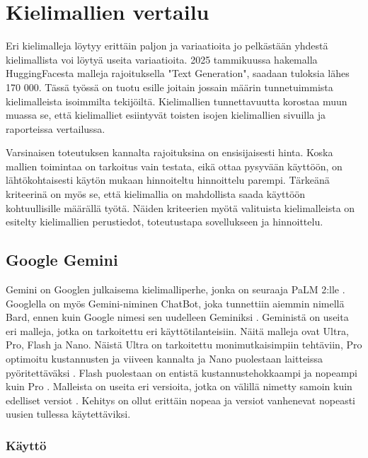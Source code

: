\chapter{Kielimallien vertailu}
\label{ch:vertailu}

Eri kielimalleja löytyy erittäin paljon ja variaatioita jo pelkästään yhdestä
kielimallista voi löytyä useita variaatioita. 2025 tammikuussa hakemalla
HuggingFacesta malleja rajoituksella "Text Generation", saadaan tuloksia lähes
170 000. Tässä työssä on tuotu esille joitain jossain määrin tunnetuimmista
kielimalleista isoimmilta tekijöiltä. Kielimallien tunnettavuutta korostaa muun
muassa se, että kielimalliet esiintyvät toisten isojen kielimallien sivuilla ja
raporteissa vertailussa.

Varsinaisen toteutuksen kannalta rajoituksina on ensisijaisesti hinta. Koska
mallien toimintaa on tarkoitus vain testata, eikä ottaa pysyvään käyttöön, on
lähtökohtaisesti käytön mukaan hinnoiteltu hinnoittelu parempi. Tärkeänä
kriteerinä on myös se, että kielimallia on mahdollista saada käyttöön
kohtuullisille määrällä työtä. Näiden kriteerien myötä valituista kielimalleista
on esitelty kielimallien perustiedot, toteutustapa sovellukseen ja hinnoittelu.

\section{Google Gemini}

Gemini on Googlen julkaisema kielimalliperhe, jonka on seuraaja PaLM 2:lle
\parencite{googleKeynote2023}. Googlella on myös Gemini-niminen ChatBot, joka
tunnettiin aiemmin nimellä Bard, ennen kuin Google nimesi sen uudelleen
Geminiksi \parencite{geminiUpdates}. Geministä on useita eri malleja, jotka on
tarkoitettu eri käyttötilanteisiin. Näitä malleja ovat Ultra, Pro, Flash ja
Nano. \parencite{googleDeepmindGemini} Näistä Ultra on tarkoitettu
monimutkaisimpiin tehtäviin, Pro optimoitu kustannusten ja viiveen kannalta ja
Nano puolestaan laitteissa pyöritettäväksi
\parencite{googleDeepmindGeminiv1report}. Flash puolestaan on entistä
kustannustehokkaampi ja nopeampi kuin Pro \parencite{googleKeynote2024}.
Malleista on useita eri versioita, jotka on välillä nimetty samoin kuin
edelliset versiot \parencite{googleDeepmindGeminiv1_5report}. Kehitys on ollut
erittäin nopeaa ja versiot vanhenevat nopeasti uusien tullessa käytettäviksi.

\subsection{Käyttö}

